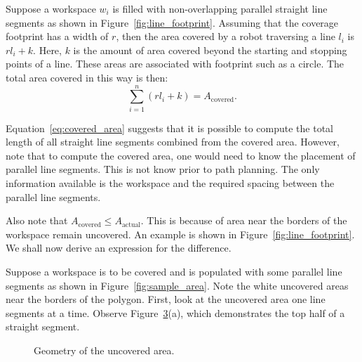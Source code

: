 \documentclass[../main.tex]{subfiles}
\begin{document}
Suppose a workspace $w_i$ is filled with non-overlapping parallel straight line segments as shown in Figure~\ref{fig:line_footprint}. Assuming that the coverage footprint has a width of $r$, then the area covered by a robot traversing a line $l_i$ is $rl_i+k$. Here, $k$ is the amount of area covered beyond the starting and stopping points of a line. These areas are associated with footprint such as a circle. The total area covered in this way is then:
\begin{equation}
	\label{eq:covered_area}
	\sum_{i=1}^n(rl_i+k)=A_{\text{covered}}.%
\end{equation}


Equation~\ref{eq:covered_area} suggests that it is possible to compute the total length of all straight line segments combined from the covered area. However, note that to compute the covered area, one would need to know the placement of parallel line segments. This is not know prior to path planning. The only information available is the workspace and the required spacing between the parallel line segments.

Also note that $A_{\text{covered}}\leq A_{\text{actual}}$. This is because of area near the borders of the workspace remain uncovered. An example is shown in Figure~\ref{fig:line_footprint}. We shall now derive an expression for the difference.

Suppose a workspace is to be covered and is populated with some parallel line segments as shown in Figure~\ref{fig:sample_area}. Note the white uncovered areas near the borders of the polygon. First, look at the uncovered area one line segments at a time. Observe Figure~\ref{fig:area_error}(a), which demonstrates the top half of a straight segment.

%

\begin{figure}
	\centering
	\begin{subfigure}{0.5\linewidth}
		\centering
		\caption{\label{fig:area_error_i}}
	\end{subfigure}%
	\begin{subfigure}{0.5\linewidth}
		\centering
		
		\caption{\label{fig:area_error_i}}
	\end{subfigure}
	\caption{Geometry of the uncovered area.}
	\label{fig:area_error}
\end{figure}
\end{document}
